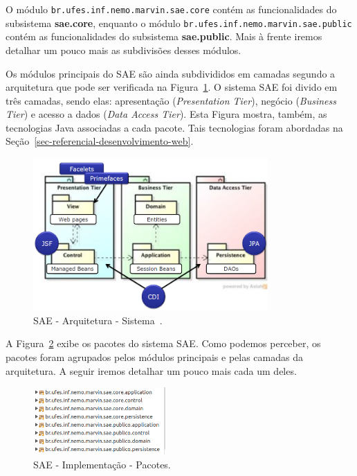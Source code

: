 O módulo \texttt{br.ufes.inf.nemo.marvin.sae.core} contém as funcionalidades do subsistema \textbf{sae.core}, enquanto o módulo \texttt{br.ufes.inf.nemo.marvin.sae.public} contém as funcionalidades do subsistema \textbf{sae.public}. Mais à frente iremos detalhar um pouco mais as subdivisões desses módulos.


Os módulos principais do SAE são ainda subdivididos em camadas segundo a arquitetura que pode ser verificada na Figura~\ref{fig-projeto-arquitetura-sistema}. O sistema SAE foi divido em três camadas, sendo elas: apresentação (\textit{Presentation Tier}), negócio (\textit{Business Tier}) e acesso a dados (\textit{Data Access Tier}). Esta Figura mostra, também, as tecnologias Java associadas a cada pacote. Tais tecnologias foram abordadas na Seção~\ref{sec-referencial-desenvolvimento-web}.

\begin{figure}[h]
	\centering
	\includegraphics[width=0.8\textwidth]{figuras/projeto/fig-projeto-arquitetura-sistema}
	\caption{SAE - Arquitetura - Sistema~\cite{lima-pg15}.}	
	\label{fig-projeto-arquitetura-sistema}
\end{figure}

A Figura~\ref{fig-projeto-arquitetura-pacotes} exibe os pacotes do sistema SAE. Como podemos perceber, os pacotes foram agrupados pelos módulos principais e pelas camadas da arquitetura. A seguir iremos detalhar um pouco mais cada um deles.

\begin{figure}[h]
	\centering
	\includegraphics[width=0.45\textwidth]{figuras/projeto/fig-projeto-arquitetura-pacotes}
	\caption{SAE - Implementação - Pacotes.}
	\label{fig-projeto-arquitetura-pacotes}
\end{figure}




